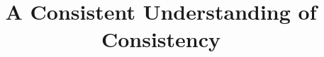 \documentclass[journal,compsoc]{IEEEtran}
\begin{document}
 
\title{A Consistent Understanding of Consistency} 
\end{document}
